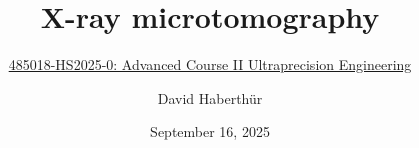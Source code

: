 
\title{X-ray microtomography}
\subtitle{\href{https://ilias.unibe.ch/go/sess/3391298}{485018-HS2025-0: Advanced Course II Ultraprecision Engineering}}
\author{David Haberthür}
\date{September 16, 2025}


\newcommand{\everyframe}{1}%
\newcommand{\imagewidth}{\linewidth}%
\newcommand{\standardimagewidth}{\linewidth}%
\newcommand{\imageheight}{0.72\paperheight}%
\newcommand{\standardimageheight}{0.72\paperheight}%
\newcommand{\uct}{{\textmu}CT\xspace}%
\newcommand{\eg}{e.\,g.\xspace}%
\newcommand{\ie}{i.\,e.\xspace}%

\newlength\imagescale%


